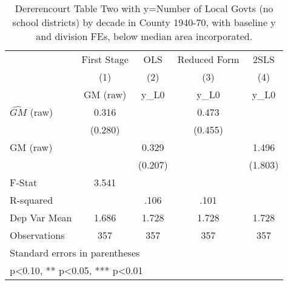 \begin{table}[htbp]\centering
\def\sym#1{\ifmmode^{#1}\else\(^{#1}\)\fi}
\caption{Dererencourt Table Two with y=Number of Local Govts (no school districts) by decade in County 1940-70, with baseline y and division FEs, below median area incorporated.}
\begin{tabular}{l*{4}{c}}
\toprule
                    & First Stage   &         OLS   &Reduced Form   &        2SLS   \\
                    &\multicolumn{1}{c}{(1)}&\multicolumn{1}{c}{(2)}&\multicolumn{1}{c}{(3)}&\multicolumn{1}{c}{(4)}\\
                    &\multicolumn{1}{c}{GM  (raw)}&\multicolumn{1}{c}{y\_L0}&\multicolumn{1}{c}{y\_L0}&\multicolumn{1}{c}{y\_L0}\\
\midrule
$\hat{GM}$ (raw)    &       0.316   &               &       0.473   &               \\
                    &     (0.280)   &               &     (0.455)   &               \\
\addlinespace
GM  (raw)           &               &       0.329   &               &       1.496   \\
                    &               &     (0.207)   &               &     (1.803)   \\
\midrule
F-Stat              &       3.541   &               &               &               \\
R-squared           &               &        .106   &        .101   &               \\
Dep Var Mean        &       1.686   &       1.728   &       1.728   &       1.728   \\
Observations        &         357   &         357   &         357   &         357   \\
\bottomrule
\multicolumn{5}{l}{\footnotesize Standard errors in parentheses}\\
\multicolumn{5}{l}{\footnotesize * p<0.10, ** p<0.05, *** p<0.01}\\
\end{tabular}
\end{table}
